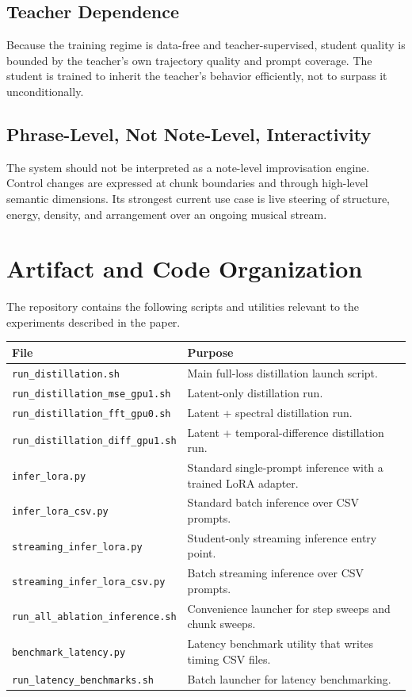 \documentclass[11pt]{article}
\begin{document}
\subsection{Teacher Dependence}

Because the training regime is data-free and teacher-supervised, student quality is bounded by the teacher's own trajectory quality and prompt coverage. The student is trained to inherit the teacher's behavior efficiently, not to surpass it unconditionally.

\subsection{Phrase-Level, Not Note-Level, Interactivity}

The system should not be interpreted as a note-level improvisation engine. Control changes are expressed at chunk boundaries and through high-level semantic dimensions. Its strongest current use case is live steering of structure, energy, density, and arrangement over an ongoing musical stream.

\section{Artifact and Code Organization}
\label{sec:artifact_files}

The repository contains the following scripts and utilities relevant to the experiments described in the paper.

\begin{longtable}{@{}p{}p{}@{}}
\toprule
\textbf{File} & \textbf{Purpose} \\
\midrule
\endhead
\texttt{run\_distillation.sh} & Main full-loss distillation launch script. \\
\texttt{run\_distillation\_mse\_gpu1.sh} & Latent-only distillation run. \\
\texttt{run\_distillation\_fft\_gpu0.sh} & Latent + spectral distillation run. \\
\texttt{run\_distillation\_diff\_gpu1.sh} & Latent + temporal-difference distillation run. \\
\texttt{infer\_lora.py} & Standard single-prompt inference with a trained LoRA adapter. \\
\texttt{infer\_lora\_csv.py} & Standard batch inference over CSV prompts. \\
\texttt{streaming\_infer\_lora.py} & Student-only streaming inference entry point. \\
\texttt{streaming\_infer\_lora\_csv.py} & Batch streaming inference over CSV prompts. \\
\texttt{run\_all\_ablation\_inference.sh} & Convenience launcher for step sweeps and chunk sweeps. \\
\texttt{benchmark\_latency.py} & Latency benchmark utility that writes timing CSV files. \\
\texttt{run\_latency\_benchmarks.sh} & Batch launcher for latency benchmarking. \\
\bottomrule
\end{longtable}
\end{document}
